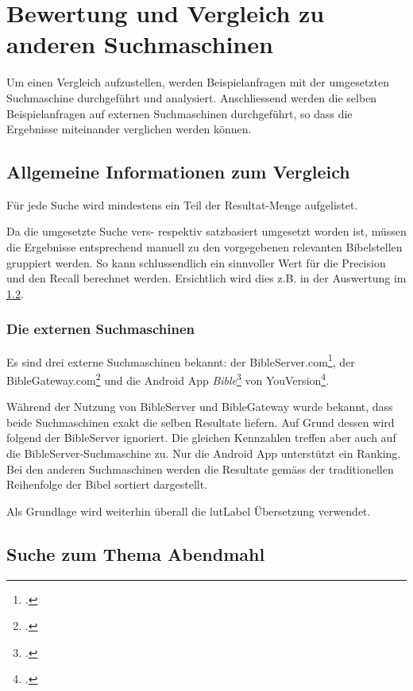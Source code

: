 \chapter{Bewertung und Vergleich zu anderen Suchmaschinen}
 \label{sec:compareSearches}
Um einen Vergleich aufzustellen, werden Beispielanfragen mit der umgesetzten Suchmaschine durchgeführt und analysiert.
Anschliessend werden die selben Beispielanfragen auf externen Suchmaschinen durchgeführt, so dass die Ergebnisse miteinander verglichen werden können.

\section{Allgemeine Informationen zum Vergleich}
Für jede Suche wird mindestens ein Teil der Resultat-Menge aufgelistet.

Da die umgesetzte Suche vers- respektiv satzbasiert umgesetzt worden ist, müssen die Ergebnisse entsprechend manuell zu den vorgegebenen relevanten Bibelstellen gruppiert werden.
So kann schlussendlich ein sinnvoller Wert für die Precision und den Recall berechnet werden.
Ersichtlich wird dies z.B. in der Auswertung im \cref{sec:index_abendmahl}.


\subsection{Die externen Suchmaschinen}
Es sind drei externe Suchmaschinen bekannt: der BibleServer.com\footcite{BibleServer_Die_Bibel_fr_alle_2016-05-30}, der BibleGateway.com\footcite{BibleGateway_2016-05-30} und die Android App \textit{Bible}\footcite{Bible_Android_Apps_on_Google_Play_2016-05-30} von YouVersion\footcite{YouVersion_2016-06-13}.

Während der Nutzung von BibleServer und BibleGateway wurde bekannt, dass beide Suchmaschinen exakt die selben Resultate liefern.
Auf Grund dessen wird folgend der BibleServer ignoriert. Die gleichen Kennzahlen treffen aber auch auf die BibleServer-Suchmaschine zu.
Nur die Android App unterstützt ein Ranking. Bei den anderen Suchmaschinen werden die Resultate gemäss der traditionellen Reihenfolge der Bibel sortiert dargestellt.

Als Grundlage wird weiterhin überall die \gls{lutLabel} Übersetzung verwendet.



\newpage
\section{Suche zum Thema Abendmahl}
\label{sec:index_abendmahl}

